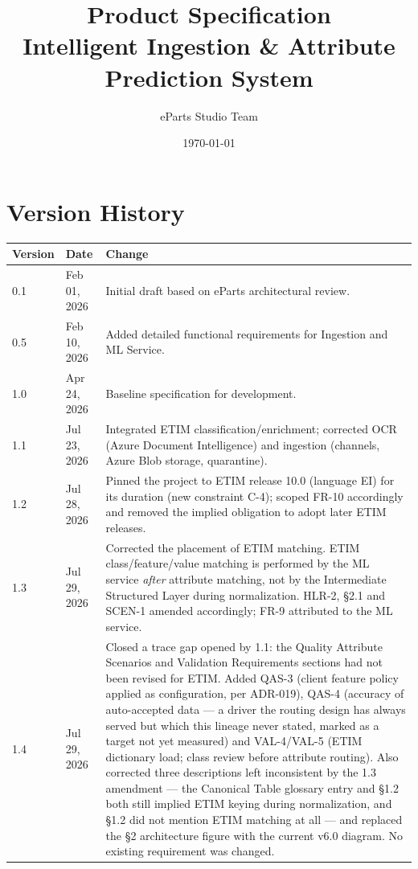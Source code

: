 \documentclass[12pt, a4paper]{article}
\title{Product Specification \\ \vspace{0.5cm} \Large Intelligent Ingestion \& Attribute Prediction System}
\author{eParts Studio Team}
\date{\today}
\begin{document}
\hypersetup{pageanchor=false}

\maketitle
\thispagestyle{empty}
\newpage

\pagestyle{fancy}
\hypersetup{pageanchor=true}
\setcounter{page}{1}
\tableofcontents
\newpage
{}

\section*{Version History}
\begin{tabular}{@{}llp{10cm}@{}}
\toprule
\textbf{Version} & \textbf{Date} & \textbf{Change} \\
\midrule
0.1 & Feb 01, 2026 & Initial draft based on eParts architectural review. \\
0.5 & Feb 10, 2026 & Added detailed functional requirements for Ingestion and ML Service. \\
1.0 & Apr 24, 2026 & Baseline specification for development. \\
1.1 & Jul 23, 2026 & Integrated ETIM classification/enrichment; corrected OCR (Azure Document Intelligence) and ingestion (channels, Azure Blob storage, quarantine). \\
1.2 & Jul 28, 2026 & Pinned the project to ETIM release 10.0 (language EI) for its duration (new constraint C-4); scoped FR-10 accordingly and removed the implied obligation to adopt later ETIM releases. \\
1.3 & Jul 29, 2026 & Corrected the placement of ETIM matching. ETIM class/feature/value matching is performed by the ML service \emph{after} attribute matching, not by the Intermediate Structured Layer during normalization. HLR-2, \S2.1 and SCEN-1 amended accordingly; FR-9 attributed to the ML service. \\
1.4 & Jul 29, 2026 & Closed a trace gap opened by 1.1: the Quality Attribute Scenarios and Validation Requirements sections had not been revised for ETIM. Added QAS-3 (client feature policy applied as configuration, per ADR-019), QAS-4 (accuracy of auto-accepted data --- a driver the routing design has always served but which this lineage never stated, marked as a target not yet measured) and VAL-4/VAL-5 (ETIM dictionary load; class review before attribute routing). Also corrected three descriptions left inconsistent by the 1.3 amendment --- the Canonical Table glossary entry and \S1.2 both still implied ETIM keying during normalization, and \S1.2 did not mention ETIM matching at all --- and replaced the \S2 architecture figure with the current v6.0 diagram. No existing requirement was changed. \\
\bottomrule
\end{tabular}
\end{document}
